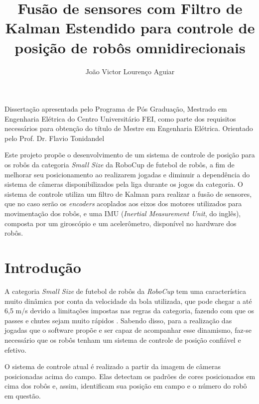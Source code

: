 \documentclass[acronym, symbols]{fei}
\title{Fusão de sensores com Filtro de Kalman Estendido para controle de posição de robôs omnidirecionais}
\author{João Victor Lourenço Aguiar}
\begin{document}
	
\maketitle

\begin{folhaderosto}
	Dissertação apresentada pelo Programa de Pós Graduação, Mestrado em Engenharia Elétrica do Centro Universitário FEI, como parte dos requisitos necessários para obtenção do título de Mestre em Engenharia Elétrica. Orientado pelo Prof. Dr. Flavio Tonidandel
\end{folhaderosto}
	
\begin{resumo}

	Este projeto propõe o desenvolvimento de um sistema de controle de posição para os robôs da categoria \textit{Small Size} da RoboCup de futebol de robôs, a fim de melhorar seu posicionamento ao realizarem jogadas e diminuir a dependência do sistema de câmeras disponibilizados pela liga durante os jogos da categoria. O sistema de controle utiliza um filtro de Kalman para realizar a fusão de sensores, que no caso serão os \textit{encoders} acoplados aos eixos dos motores utilizados para movimentação dos robôs, e uma IMU (\textit{Inertial Measurement Unit}, do inglês), composta por um giroscópio e um acelerômetro, disponível no hardware dos robôs.

\end{resumo}

\listoffigures
\listoftables
\printglossaries
\tableofcontents

\chapter{Introdução}

	A categoria \textit{Small Size} de futebol de robôs da \textit{RoboCup} tem uma característica muito dinâmica por conta da velocidade da bola utilizada, que pode chegar a até 6,5 m/s devido a limitações impostas nas regras da categoria, fazendo com que os passes e chutes sejam muito rápidos \cite{rules}. Sabendo disso, para a realização das jogadas que o software propõe e ser capaz de acompanhar esse dinamismo, faz-se necessário que os robôs tenham um sistema de controle de posição confiável e efetivo.
	
	O sistema de controle atual é realizado a partir da imagem de câmeras posicionadas acima do campo. Elas detectam os padrões de cores posicionados em cima dos robôs e, assim, identificam sua posição em campo e o número do robô em questão. %
	
\end{document}
